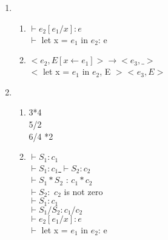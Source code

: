 \documentclass[11pt]{article}
\begin{document}
\begin{enumerate}
\item 
\begin{enumerate}

\item \underline{$\vdash e_2[e_1/x]: e$}\\
		$\vdash$ let x = $e_1$ in $e_2$: e\\
		
\item \underline{$<e_2, E[x \gets e_1]> \to <e_3,\_>$}\\
		$<$ let x = $e_1$ in $e_2$, E $>$ \to < $e_3,E >$\\
		
\end{enumerate}

\item 

\begin{enumerate}
\item 3*4\\
	5/2\\
	6/4 *2\\
	
\item $\vdash S_1:c_1$\\

		\underline{$\vdash S_1:c_1$ \hspace{12} $\vdash S_2:c_2$}\\
		$\vdash S_1*S_2$ : $c_1*c_2$\\
		
		$\vdash S_2:$ $c_2$ is not zero\\
		\underline{$\vdash S_1:c_1$}\\
		$\vdash S_1/S_2 : c_1/c_2$\\
		
		\underline{$\vdash e_2[e_1/x]:e$}\\
		$\vdash$ let x = $e_1$ in $e_2$: e\\
		
\end{enumerate}


\end{enumerate}
\end{document}
